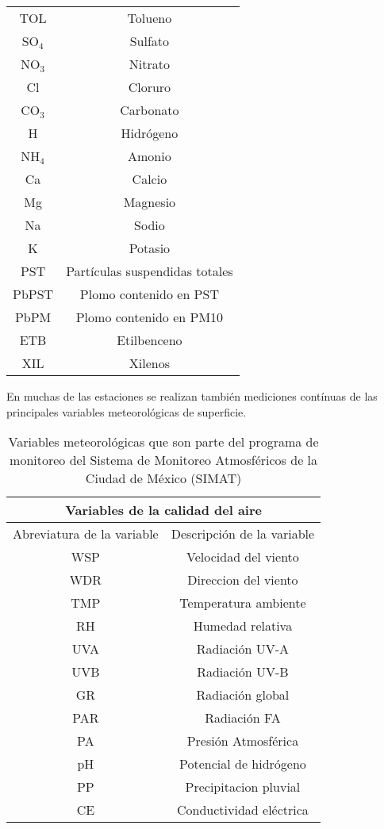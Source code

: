 \begin{table}
\begin{tabular}{ | c | c | }
        TOL         & Tolueno \\
        SO$_4$      & Sulfato \\
        NO$_3$      & Nitrato \\
        Cl          & Cloruro \\
        CO$_3$      & Carbonato \\
        H           & Hidrógeno \\
        NH$_4$      & Amonio \\
        Ca          & Calcio \\
        Mg          & Magnesio \\
        Na          & Sodio \\
        K           & Potasio \\
        PST         & Partículas suspendidas totales \\
        PbPST       & Plomo contenido en PST \\
        PbPM        & Plomo contenido en PM10 \\
        ETB         & Etilbenceno \\
        XIL         & Xilenos \\
        \hline
    \end{tabular}
\end{table}
\FloatBarrier

En muchas de las estaciones se realizan también mediciones contínuas de las principales variables meteorológicas de superficie.

\FloatBarrier
\begin{table}
    \centering
    \caption{Variables meteorológicas que son parte del programa de monitoreo del Sistema de Monitoreo Atmosféricos de la Ciudad de México (SIMAT)\label{tab:meteor}}
    \begin{tabular}{ | c | c | }
        \hline
        \multicolumn{2}{|c|}{Variables de la calidad del aire} \\
        \hline
        Abreviatura de la variable & Descripción de la variable \\
        \hline
        WSP         & Velocidad del viento \\
        WDR         & Direccion del viento \\
        TMP         & Temperatura ambiente \\
        RH          & Humedad relativa \\
        UVA         & Radiación UV-A \\
        UVB         & Radiación UV-B \\
        GR          & Radiación global \\
        PAR         & Radiación FA \\
        PA          & Presión Atmosférica \\
        pH          & Potencial de hidrógeno \\
        PP          & Precipitacion pluvial \\
        CE          & Conductividad eléctrica \\
        \hline
    \end{tabular}
\end{table}
\FloatBarrier

